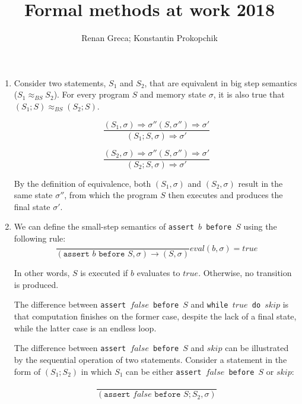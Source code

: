 \documentclass[11pt]{article}
\begin{document}
\title{Formal methods at work 2018}
\author{Renan Greca; Konstantin Prokopchik}

\maketitle

\begin{enumerate}
	\item Consider two statements, $S_1$ and $S_2$, that are equivalent in big step semantics ($S_1 \approx_{BS} S_2$).
		For every program $S$ and memory state $
	\sigma$, it is also true that $(S_1;S) \approx_{BS} (S_2;S)$. 
		
		\begin{equation*}
			\frac{(S_1,\sigma)\Rightarrow\sigma'' (S,\sigma'')\Rightarrow\sigma'}{(S_1;S,\sigma)\Rightarrow\sigma'} 
		\end{equation*}
		
		\begin{equation*}
			\frac{(S_2,\sigma)\Rightarrow\sigma'' (S,\sigma'')\Rightarrow\sigma'}{(S_2;S,\sigma)\Rightarrow\sigma'}
		\end{equation*}
		
		By the definition of equivalence, both $(S_1,\sigma)$ and $(S_2,\sigma)$ result in the same state $\sigma''$, from which the program $S$ then executes and produces the final state $\sigma'$.
				
	\item We can define the small-step semantics of \texttt{assert $b$ before $S$} using the following rule:
		\begin{equation*}
			\frac{}{(\texttt{assert }b\texttt{ before }S,\sigma)\rightarrow (S,\sigma)}eval(b,\sigma)=true
		\end{equation*}
		
		In other words, $S$ is executed if $b$ evaluates to $true$. Otherwise, no transition is produced.
		
		The difference between \texttt{assert $false$ before $S$} and \texttt{while $true$ do $skip$} is that computation finishes on the former case, despite the lack of a final state, while the latter case is an endless loop.
		
		The difference between \texttt{assert $false$ before $S$} and $skip$ can be illustrated by the sequential operation of two statements.	Consider a statement in the form of $(S_1;S_2)$ in which $S_1$ can be either \texttt{assert $false$ before $S$} or $skip$:
		
		\begin{equation*}
			\frac{}{(\texttt{assert }false\texttt{ before }S;S_2,\sigma)}	
		\end{equation*}
		

\end{enumerate}
\end{document}

